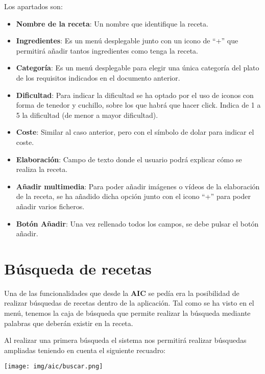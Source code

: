\documentclass{\ClassPath/viu-tfm-template}
\begin{document}
Los apartados son:

\vspace{-1em}
\begin{itemize}
    \item \textbf{Nombre de la receta}: Un nombre que identifique la receta.
    \item \textbf{Ingredientes}: Es un menú desplegable junto con un icono de “+” que permitirá añadir tantos ingredientes como tenga la receta.
    \item \textbf{Categoría}: Es un menú desplegable para elegir una única categoría del plato de los requisitos indicados en el documento anterior.
    \item \textbf{Dificultad}: Para indicar la dificultad se ha optado por el uso de iconos con forma de tenedor y cuchillo, sobre los que habrá que hacer click. Indica de 1 a 5 la dificultad (de menor a mayor dificultad).
    \item \textbf{Coste}: Similar al caso anterior, pero con el símbolo de dolar para indicar el coste.
    \item \textbf{Elaboración}: Campo de texto donde el usuario podrá explicar cómo se realiza la receta.
    \item \textbf{Añadir multimedia}: Para poder añadir imágenes o vídeos de  la elaboración de la receta, se ha añadido dicha opción junto con el icono “+” para poder añadir varios ficheros.
    \item \textbf{Botón Añadir}: Una vez rellenado todos los campos, se debe pulsar el botón añadir.
\end{itemize}


\section{Búsqueda de recetas}

Una de las funcionalidades que desde la \textbf{AIC} se pedía era la posibilidad de realizar búsquedas de recetas dentro de la aplicación. Tal como se ha visto en el menú, tenemos la caja de búsqueda que permite realizar la búsqueda mediante palabras que deberán existir en la receta.

Al realizar una primera búsqueda el sistema nos permitirá realizar búsquedas ampliadas teniendo en cuenta el siguiente recuadro:

    \begin{center}
        \vspace{-10pt}
        \texttt{[image: img/aic/buscar.png]}
        \vspace{-20pt}
    \end{center}
\end{document}

